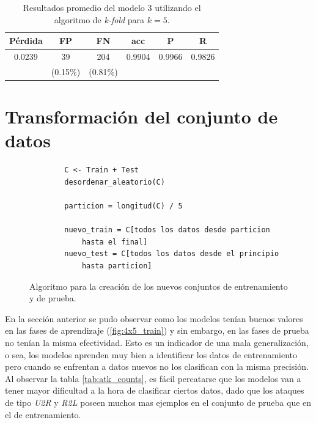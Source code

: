 \begin{table}[t]
    \begin{center}
        \label{tab:kfold_results}
        \begin{tabular}{c|c|c|c|c|c} %
        \textbf{Pérdida} & \textbf{FP} & \textbf{FN} & \textbf{acc} & \textbf{P} & \textbf{R}\\
        \hline
        0.0239 & 39 & 204 & 0.9904 & 0.9966 & 0.9826\\
        &(0.15\%) & (0.81\%) &&&\\
        \end{tabular}

        \caption{Resultados promedio del modelo 3 utilizando el algoritmo de \textit{k-fold} para $k = 5$.}
    \end{center}
\end{table}


\section{Transformación del conjunto de datos}

\begin{figure}[b]
    \begin{verbatim}
        C <- Train + Test
        desordenar_aleatorio(C)
    
        particion = longitud(C) / 5
    
        nuevo_train = C[todos los datos desde particion 
            hasta el final]
        nuevo_test = C[todos los datos desde el principio 
            hasta particion]
    \end{verbatim}
    \caption{Algoritmo para la creación de los nuevos conjuntos de entrenamiento y de prueba.}
    \label{fig:partition}
\end{figure}

En la sección anterior se pudo observar como los modelos tenían buenos valores en las fases de aprendizaje (\ref{fig:4x5_train}) y sin embargo, en las fases de prueba no tenían la misma efectividad. Esto es un indicador de una mala generalización, o sea, los modelos aprenden muy bien a identificar los datos de entrenamiento pero cuando se enfrentan a datos nuevos no los clasifican con la misma precisión. Al observar la tabla \ref{tab:atk_counts}, es fácil percatarse que los modelos van a tener mayor dificultad a la hora de clasificar ciertos datos, dado que los ataques de tipo \textit{U2R} y \textit{R2L} poseen muchos mas ejemplos en el conjunto de prueba que en el de entrenamiento. 

